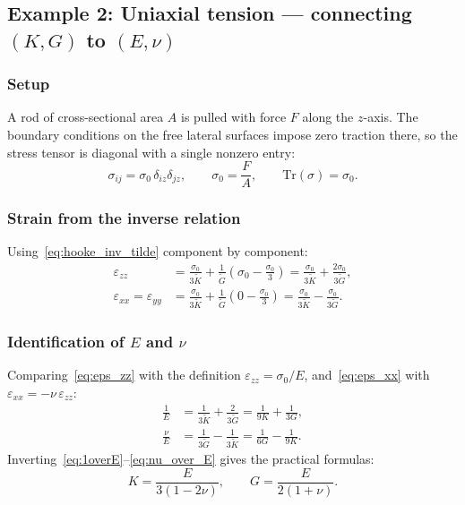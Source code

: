 \subsection*{Example 2: Uniaxial tension — connecting $(K,G)$ to $(E,\nu)$}

\subsubsection*{Setup}
A rod of cross-sectional area $A$ is pulled with force $F$ along the $z$-axis. The boundary conditions on the free lateral surfaces impose zero traction there, so the stress tensor is diagonal with a single nonzero entry:
\[
    \sigma_{ij} = \sigma_0\,\delta_{iz}\delta_{jz}, \qquad \sigma_0 = \frac{F}{A}, \qquad \mathrm{Tr}(\sigma) = \sigma_0.
\]

\subsubsection*{Strain from the inverse relation}

Using~\eqref{eq:hooke_inv_tilde} component by component:
\begin{align}
    \varepsilon_{zz} &= \frac{\sigma_0}{3\tilde{K}} + \frac{1}{\tilde{G}}\!\left(\sigma_0 - \frac{\sigma_0}{3}\right)
                      = \frac{\sigma_0}{3\tilde{K}} + \frac{2\sigma_0}{3\tilde{G}}, \label{eq:eps_zz}\\[6pt]
    \varepsilon_{xx} = \varepsilon_{yy} &= \frac{\sigma_0}{3\tilde{K}} + \frac{1}{\tilde{G}}\!\left(0 - \frac{\sigma_0}{3}\right)
                      = \frac{\sigma_0}{3\tilde{K}} - \frac{\sigma_0}{3\tilde{G}}. \label{eq:eps_xx}
\end{align}

\subsubsection*{Identification of $E$ and $\nu$}

Comparing~\eqref{eq:eps_zz} with the definition $\varepsilon_{zz}=\sigma_0/E$, and~\eqref{eq:eps_xx} with $\varepsilon_{xx}=-\nu\,\varepsilon_{zz}$:
\begin{align}
    \frac{1}{E} &= \frac{1}{3\tilde{K}} + \frac{2}{3\tilde{G}} = \frac{1}{9K} + \frac{1}{3G}, \label{eq:1overE}\\[6pt]
    \frac{\nu}{E} &= \frac{1}{3\tilde{G}} - \frac{1}{3\tilde{K}} = \frac{1}{6G} - \frac{1}{9K}. \label{eq:nu_over_E}
\end{align}
Inverting~\eqref{eq:1overE}--\eqref{eq:nu_over_E} gives the practical formulas:
\begin{equation}
    \boxed{K = \frac{E}{3(1-2\nu)}, \qquad G = \frac{E}{2(1+\nu)}.}
    \label{eq:KG_from_Enu}
\end{equation}

